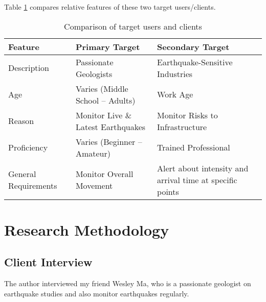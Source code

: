 Table \ref{tab:users} compares relative features of these two target users/clients.

\begin{table}[!ht]
    \centering

    \begin{tabular}{|p{55pt}||p{145pt}|p{145pt}|}
        \hline
        Feature              & Primary Target                     & Secondary Target                                          \\
        \hline
        Description          & Passionate Geologists              & Earthquake-Sensitive Industries                           \\
        Age                  & Varies (Middle School -- Adults)   & Work Age                                                  \\
        Reason               & Monitor Live \& Latest Earthquakes & Monitor Risks to Infrastructure                           \\
        Proficiency          & Varies (Beginner -- Amateur)       & Trained Professional                                      \\
        General Requirements & Monitor Overall Movement           & Alert about intensity and arrival time at specific points \\
        \hline
    \end{tabular}

    \caption{Comparison of target users and clients}
    \label{tab:users}
\end{table}

\section{Research Methodology}
\subsection{Client Interview}
The author interviewed my friend Wesley Ma, who is a passionate geologist on earthquake studies and also monitor earthquakes regularly.

